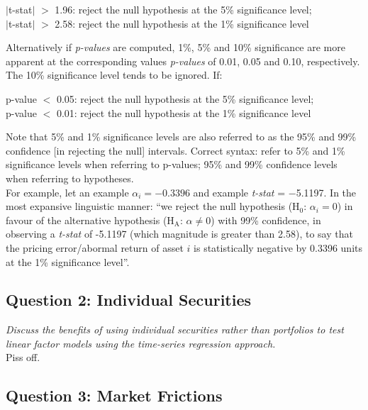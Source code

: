 \documentclass[11pt, english]{article}
\begin{document}
	\begin{center}
	$|$t-stat$|$ $>$ 1.96: reject the null hypothesis at the 5\% significance level;\\
	$|$t-stat$|$ $>$ 2.58: reject the null hypothesis at the 1\% significance level
	\end{center}

	Alternatively if \textit{p-values} are computed, 1\%, 5\% and 10\% significance are more apparent at the corresponding values \textit{p-values} of 0.01, 0.05 and 0.10, respectively. The 10\% significance level tends to be ignored. If:

	\begin{center}
	p-value $<$ 0.05: reject the null hypothesis at the 5\% significance level;\\
	p-value $<$ 0.01: reject the null hypothesis at the 1\% significance level
	\end{center}

	Note that 5\% and 1\% significance levels are also referred to as the 95\% and 99\% confidence [in rejecting the null] intervals. Correct syntax: refer to 5\% and 1\% significance levels when referring to p-values; 95\% and 99\% confidence levels when referring to hypotheses.\\

	For example, let an example $\alpha_i=-0.3396$ and example \textit{t-stat} = $-$5.1197. In the most expansive linguistic manner: ``we reject the null hypothesis (H$_0$: $\alpha_i=0$) in favour of the alternative hypothesis (H$\mathrm{_A}$: $\alpha\neq0$) with 99\% confidence, in observing a \textit{t-stat} of -5.1197 (which magnitude is greater than 2.58), to say that the pricing error/abormal return of asset $i$ is statistically negative by 0.3396 units at the 1\% significance level''.\\

	\newpage

	\subsection{Question 2: Individual Securities}

	\textit{Discuss the benefits of using individual securities rather than portfolios to test linear factor models using the time-series regression approach.}\\

	Piss off.

	\newpage

	\subsection{Question 3: Market Frictions}
        
\end{document}
